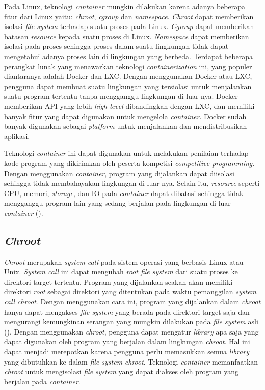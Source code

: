 \par Pada Linux, teknologi \textit{container} mungkin dilakukan karena adanya beberapa fitur dari Linux yaitu: \textit{chroot}, \textit{cgroup} dan \textit{namespace}. \textit{Chroot} dapat memberikan isolasi \textit{file system} terhadap suatu proses pada Linux. \textit{Cgroup} dapat memberikan batasan \textit{resource} kepada suatu proses di Linux. \textit{Namespace} dapat memberikan isolasi pada proses sehingga proses dalam suatu lingkungan tidak dapat mengetahui adanya proses lain di lingkungan yang berbeda. Terdapat beberapa perangkat lunak yang menawarkan teknologi \textit{containerization} ini, yang populer diantaranya adalah Docker dan LXC. Dengan menggunakan Docker atau LXC, pengguna dapat membuat suatu lingkungan yang tersiolasi untuk menjalankan suatu program tertentu tanpa mengganggu lingkungan di luar-nya. Docker memberikan API yang lebih \textit{high-level} dibandingkan dengan LXC, dan memiliki banyak fitur yang dapat digunakan untuk mengelola \textit{container}. Docker sudah banyak digunakan sebagai \textit{platform} untuk menjalankan dan mendistribusikan aplikasi.

\par Teknologi \textit{container} ini dapat digunakan untuk melakukan penilaian terhadap kode program yang dikirimkan oleh peserta kompetisi \textit{competitive programming}. Dengan menggunakan \textit{container}, program yang dijalankan dapat diisolasi sehingga tidak membahayakan lingkungan di luar-nya. Selain itu, \textit{resource} seperti CPU, memori, \textit{storage}, dan IO pada \textit{container} dapat dibatasi sehingga tidak mengganggu program lain yang sedang berjalan pada lingkungan di luar \textit{container} (\cite{merkeldocker}).

\subsection{\textit{Chroot}}

\par \textit{Chroot} merupakan \textit{system call} pada sistem operasi yang berbasis Linux atau Unix. \textit{System call} ini dapat mengubah \textit{root file system} dari suatu proses ke direktori target tertentu. Program yang dijalankan seakan-akan memiliki direktori \textit{root} sebagai direktori yang ditentukan pada waktu pemanggilan \textit{system call} \textit{chroot}. Dengan menggunakan cara ini, program yang dijalankan dalam \textit{chroot} hanya dapat mengakses \textit{file system} yang berada pada direktori target saja dan mengurangi kemungkinan serangan yang mungkin dilakukan pada \textit{file system} asli (\cite{lessardchroot}). Dengan menggunakan \textit{chroot}, pengguna dapat mengatur \textit{library} apa saja yang dapat digunakan oleh program yang berjalan dalam lingkungan \textit{chroot}. Hal ini dapat menjadi merepotkan karena pengguna perlu memasukkan semua \textit{library} yang dibutuhkan ke dalam \textit{file system} \textit{chroot}. Teknologi \textit{container} memanfaatkan \textit{chroot} untuk mengisolasi \textit{file system} yang dapat diakses oleh program yang berjalan pada \textit{container}.

